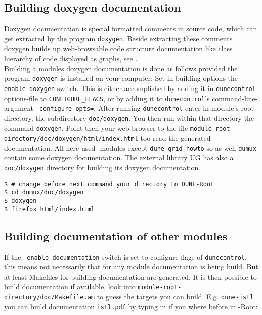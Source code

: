 \subsection{Building doxygen documentation} \label{sec:build-doxy-doc}

Doxygen documentation is special formatted comments in source code, which can get extracted by the program 
\texttt{doxygen}. Beside extracting these comments doxygen builds up web-browsable code structure documentation
like class hierarchy of code displayed as graphs, see \cite{DOXYGEN-HP}.\\

Building a modules doxygen documentation is done as follows provided the program \texttt{doxygen} is installed on your computer: Set in building options the \texttt{--enable-doxygen} switch.
This is either accomplished by adding it in \texttt{dunecontrol} options-file to  \texttt{CONFIGURE\_FLAGS}, or by adding
it to  \texttt{dunecontrol}'s command-line-argument \texttt{--configure-opts=}. 
After running \texttt{dunecontrol} enter in module's root directory, the subdirectory \texttt{doc/doxygen}.
You then run within that directory the command \texttt{doxygen}. Point then your web browser to the file 
\texttt{module-root-directory/doc/doxygen/html/index.html} too read the generated documentation.
All here used \Dune-modules except \texttt{dune-grid-howto} so as well \texttt{dumux} contain some doxygen documentation.
The external library UG has also a \texttt{doc/doxygen} directory for building its doxygen documentation.

\begin{lstlisting}[style=Bash]
$ # change before next command your directory to DUNE-Root
$ cd dumux/doc/doxygen
$ doxygen
$ firefox html/index.html
\end{lstlisting}

\subsection{Building documentation of other \Dune modules}

If the \texttt{--enable-documentation} switch is set to configure flags of \texttt{dunecontrol}, this means not necessarily that for any 
\Dune module documentation is being build. But at least Makefiles for building documentation 
are generated. It is then possible to build documentation if available, look into \texttt{module-root-directory/doc/Makefile.am}
to guess the targets you can build.
E.g. \texttt{dune-istl} you can build documentation \texttt{istl.pdf} by typing in if you where before in \Dune-Root:

